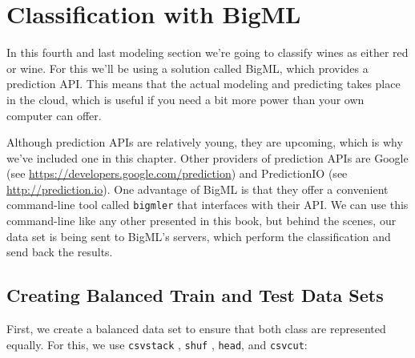 \documentclass[
]{book}
\newenvironment{Shaded}{\begin{snugshade}}{\end{snugshade}}
\newcommand{\DataTypeTok}[1]{\textcolor[rgb]{0.13,0.29,0.53}{#1}}
\newcommand{\ExtensionTok}[1]{#1}
\newcommand{\FunctionTok}[1]{\textcolor[rgb]{0.00,0.00,0.00}{#1}}
\newcommand{\KeywordTok}[1]{\textcolor[rgb]{0.13,0.29,0.53}{\textbf{#1}}}
\newcommand{\NormalTok}[1]{#1}
\newcommand{\OperatorTok}[1]{\textcolor[rgb]{0.81,0.36,0.00}{\textbf{#1}}}
\theoremstyle{definition}
\theoremstyle{definition}
\theoremstyle{definition}
\theoremstyle{remark}
\begin{document}
\hypertarget{classification-with-bigml}{%
\section{Classification with BigML}\label{classification-with-bigml}}

In this fourth and last modeling section we're going to classify wines as either red or wine. For this we'll be using a solution called BigML, which provides a prediction API. This means that the actual modeling and predicting takes place in the cloud, which is useful if you need a bit more power than your own computer can offer.

Although prediction APIs are relatively young, they are upcoming, which is why we've included one in this chapter. Other providers of prediction APIs are Google (see \url{https://developers.google.com/prediction}) and PredictionIO (see \url{http://prediction.io}). One advantage of BigML is that they offer a convenient command-line tool called \texttt{bigmler} \citep{bigmler} that interfaces with their API. We can use this command-line like any other presented in this book, but behind the scenes, our data set is being sent to BigML's servers, which perform the classification and send back the results.

\hypertarget{creating-balanced-train-and-test-data-sets}{%
\subsection{Creating Balanced Train and Test Data Sets}\label{creating-balanced-train-and-test-data-sets}}

First, we create a balanced data set to ensure that both class are represented equally. For this, we use \texttt{csvstack} \citep{csvstack}, \texttt{shuf} \citep{shuf}, \texttt{head}, and \texttt{csvcut}:

\begin{Shaded}
\end{Shaded}
\end{document}
